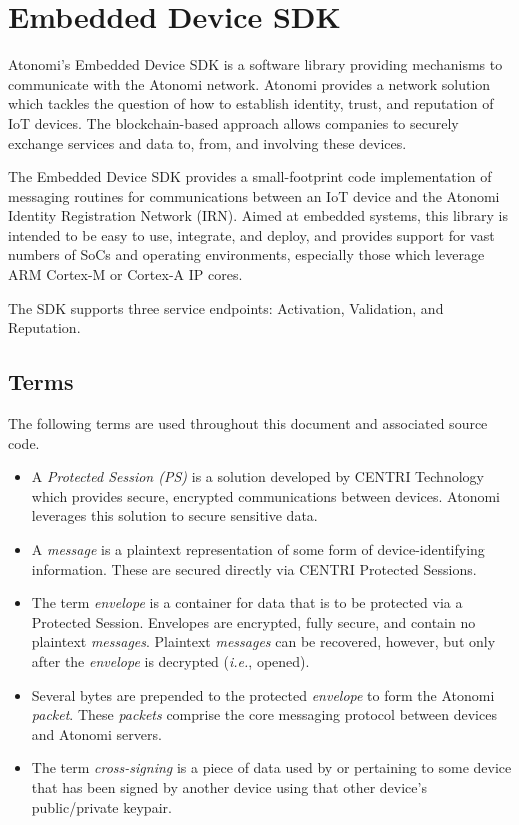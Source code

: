 \chapter{Embedded Device SDK}

Atonomi's Embedded Device SDK is a software library providing mechanisms to communicate
with the Atonomi network. Atonomi provides a network solution which tackles
the question of how to establish identity, trust, and reputation of IoT devices.
The blockchain-based approach allows companies to securely exchange services
and data to, from, and involving these devices.

The Embedded Device SDK provides a small-footprint code implementation of
messaging routines for communications between an IoT device and the Atonomi
Identity Registration Network (IRN). Aimed at embedded systems, this library
is intended to be easy to use, integrate, and deploy, and provides support
for vast numbers of SoCs and operating environments, especially those which
leverage ARM Cortex-M or Cortex-A IP cores.

The SDK supports three service endpoints: Activation, Validation, and Reputation.


\section{Terms}
The following terms are used throughout this document and associated source code.

\begin{itemize}
	\item A \textit{Protected Session (PS)} is a solution developed by CENTRI
		Technology which provides secure, encrypted communications between
		devices. Atonomi leverages this solution to secure sensitive
		data.
	\item A \textit{message} is a plaintext representation of some form of
		device-identifying information. These are secured directly via
		CENTRI Protected Sessions.
	\item The term \textit{envelope} is a container for data that is to be
		protected via a Protected Session. Envelopes are encrypted, fully
		secure, and contain no plaintext \textit{messages}. Plaintext
		\textit{messages} can be recovered, however, but only after
		the \textit{envelope} is decrypted (\textit{i.e.}, opened).
	\item Several bytes are prepended to the protected \textit{envelope} to
		form the Atonomi \textit{packet}. These \textit{packets} comprise
		the core messaging protocol between devices and Atonomi servers.
	\item The term \textit{cross-signing} is a piece of data used by or
		pertaining to some device that has been signed by another device
		using that other device's public/private keypair.
\end{itemize}


